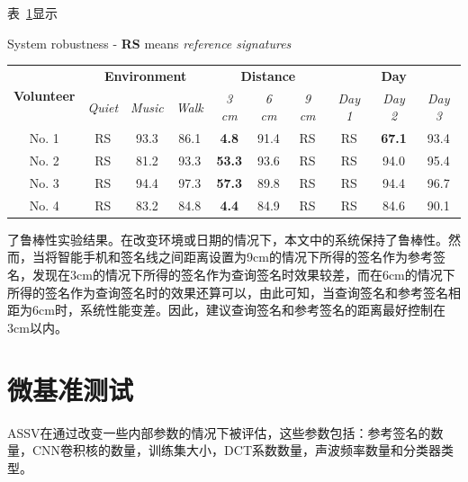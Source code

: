 表~\ref{table:system-robustness}显示
\begin{table}[ht]
  \centering
  {System robustness - \textbf{RS} means \textit{reference signatures}}
  \label{table:system-robustness}
  \begin{tabular}{|c|ccc|ccc|ccc|}
    \hline
    \multirow{2}{*}{\textbf{Volunteer}} & \multicolumn{3}{|c|}{\textbf{Environment}} & \multicolumn{3}{|c|}{\textbf{Distance}} & \multicolumn{3}{|c|}{\textbf{Day}} \\
    \cline{2-10}
     & \textit{Quiet} & \textit{Music} & \textit{Walk} & \textit{3 cm} &  \textit{6 cm} & \textit{9 cm} & \textit{Day 1} & \textit{Day 2} & \textit{Day 3}\\
    \hline
    No. 1 & RS   & 93.3 & 86.1  & \textbf{4.8} & 91.4 & RS &  RS & \textbf{67.1} & 93.4  \\  
    \hline
    No. 2 & RS & 81.2 & 93.3  & \textbf{53.3} & 93.6 & RS & RS & 94.0 & 95.4 \\
    \hline
    No. 3 & RS & 94.4 & 97.3  & \textbf{57.3} & 89.8 & RS & RS &  94.4 & 96.7 \\
    \hline
    No. 4 & RS & 83.2 & 84.8  & \textbf{4.4} & 84.9 & RS & RS &  84.6 & 90.1 \\
    \hline 
  \end{tabular}
\end{table}
了鲁棒性实验结果。在改变环境或日期的情况下，本文中的系统保持了鲁棒性。然而，当将智能手机和签名线之间距离设置为9cm的情况下所得的签名作为参考签名，发现在3cm的情况下所得的签名作为查询签名时效果较差，而在6cm的情况下所得的签名作为查询签名时的效果还算可以，由此可知，当查询签名和参考签名相距为6cm时，系统性能变差。因此，建议查询签名和参考签名的距离最好控制在3cm以内。


\section{微基准测试}
ASSV在通过改变一些内部参数的情况下被评估，这些参数包括：参考签名的数量，CNN卷积核的数量，训练集大小，DCT系数数量，声波频率数量和分类器类型。

